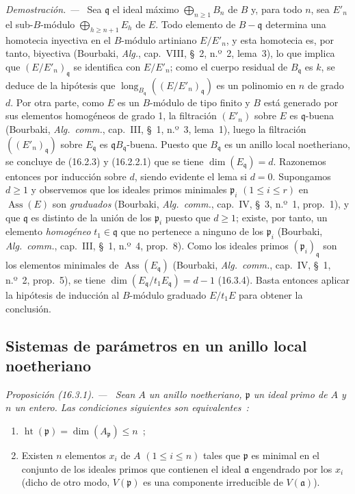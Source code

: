 \documentclass[10pt,oneside]{book}
\makeatletter
\newcommand{\setmanualcurrentlabel}[1]{\def\@currentlabel{#1}}
\newenvironment{proposition}[1][]{%
  \setmanualcurrentlabel{#1}\par\medskip\noindent\itshape Proposición (#1). ---\ }{\par}
\newenvironment{proof}{%
  \par\medskip\noindent\textit{Demostración. ---\ }}{\par}
\providecommand{\setmin}{-}%
\makeatother
\begin{document}
\begin{proof}
Sea $\mathfrak{q}$ el ideal máximo $\bigoplus_{n\geq1}B_n$ de $B$ y, para todo
$n$, sea $E'_n$ el sub-$B$-módulo $\bigoplus_{h\geq n+1}E_h$ de $E$. Todo
elemento de $B\setmin\mathfrak{q}$ determina una homotecia inyectiva en el
$B$-módulo artiniano $E/E'_n$, y esta homotecia es, por tanto, biyectiva
(Bourbaki, \emph{Alg.}, cap.~VIII, \S~2, n.º~2, lema~3), lo que implica que
$(E/E'_n)_{\mathfrak{q}}$ se identifica con $E/E'_n$; como el cuerpo residual
de $B_{\mathfrak{q}}$ es $k$, se deduce de la hipótesis que
$\operatorname{long}_{B_{\mathfrak{q}}}((E/E'_n)_{\mathfrak{q}})$ es un
polinomio en $n$ de grado $d$. Por otra parte, como $E$ es un $B$-módulo de
tipo finito y $B$ está generado por sus elementos homogéneos de grado 1, la
filtración $(E'_n)$ sobre $E$ es $\mathfrak{q}$-buena (Bourbaki,
\emph{Alg.~comm.}, cap.~III, \S~1, n.º~3, lema~1), luego la filtración
$((E'_n)_{\mathfrak{q}})$ sobre $E_{\mathfrak{q}}$ es
$\mathfrak{q}B_{\mathfrak{q}}$-buena. Puesto que $B_{\mathfrak{q}}$ es un
anillo local noetheriano, se concluye de (16.2.3) y (16.2.2.1) que se tiene
$\dim(E_{\mathfrak{q}})=d$. Razonemos entonces por inducción sobre $d$, siendo
evidente el lema si $d=0$. Supongamos $d\geq1$ y observemos que los ideales
primos minimales $\mathfrak{p}_i$ $(1\leq i\leq r)$ en
$\operatorname{Ass}(E)$ son \emph{graduados} (Bourbaki, \emph{Alg.~comm.},
cap.~IV, \S~3, n.º~1, prop.~1), y que $\mathfrak{q}$ es distinto de la unión
de los $\mathfrak{p}_i$ puesto que $d\geq1$; existe, por tanto, un elemento
\emph{homogéneo} $t_1\in\mathfrak{q}$ que no pertenece a ninguno de los
$\mathfrak{p}_i$ (Bourbaki, \emph{Alg.~comm.}, cap.~III, \S~1, n.º~4,
prop.~8). Como los ideales primos $(\mathfrak{p}_i)_{\mathfrak{q}}$ son los
elementos minimales de $\operatorname{Ass}(E_{\mathfrak{q}})$ (Bourbaki,
\emph{Alg.~comm.}, cap.~IV, \S~1, n.º~2, prop.~5), se tiene
$\dim(E_{\mathfrak{q}}/t_1E_{\mathfrak{q}})=d\setmin 1$ (16.3.4). Basta entonces
aplicar la hipótesis de inducción al $B$-módulo graduado $E/t_1E$ para obtener
la conclusión.
\end{proof}
\subsection{Sistemas de parámetros en un anillo local noetheriano}
\label{subsection:0.16.3-es}

\begin{proposition}[16.3.1]
\label{0.16.3.1-es}
Sean $A$ un anillo noetheriano, $\mathfrak{p}$ un ideal primo de $A$ y $n$ un
entero. Las condiciones siguientes son equivalentes~:
\begin{enumerate}
  \item[\textup{a)}] $\operatorname{ht}(\mathfrak{p})=
  \dim(A_{\mathfrak{p}})\leq n$~;
  \item[\textup{b)}] Existen $n$ elementos $x_i$ de $A$ $(1\leq i\leq n)$ tales que
  $\mathfrak{p}$ es minimal en el conjunto de los ideales primos que contienen
  el ideal $\mathfrak{a}$ engendrado por los $x_i$ \textup{(dicho de otro modo,}
  $V(\mathfrak{p})$ es una componente irreducible de $V(\mathfrak{a})$).
\end{enumerate}
\end{proposition}
\end{document}

